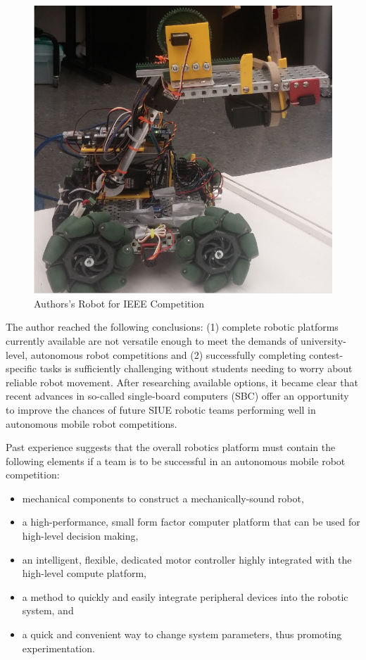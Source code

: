 \documentclass[12pt,oneside,final]{siuethesis}
\theoremstyle{definition}
\begin{document}
\begin{figure}[htbp!]
\centering
\includegraphics[scale=.6,keepaspectratio=true]{./images/FaberRobot.png} 
\caption{Authors's Robot for IEEE Competition}
\label{fig:FaberRobot}
\end{figure}

The author reached the following conclusions: (1) complete robotic platforms currently available are not versatile enough to meet the demands of university-level, autonomous robot competitions and (2) successfully completing contest-specific tasks is sufficiently challenging without students needing to worry about reliable robot movement.  After researching available options, it became clear that recent advances in so-called single-board computers (SBC) offer an opportunity to improve the chances of future SIUE robotic teams performing well in autonomous mobile robot competitions. 

Past experience suggests that the overall robotics platform must contain the following elements if a team is to be successful in an autonomous mobile robot competition:

\begin{itemize}
\item 
mechanical components to construct a mechanically-sound robot,
\item
a high-performance, small form factor computer platform that can be used for high-level decision making,
\item
an intelligent, flexible, dedicated motor controller highly integrated with the high-level compute platform, 
\item
a method to quickly and easily integrate peripheral devices into the robotic system, and
\item
a quick and convenient way to change system parameters, thus promoting experimentation.
\end{itemize}
\end{document}
